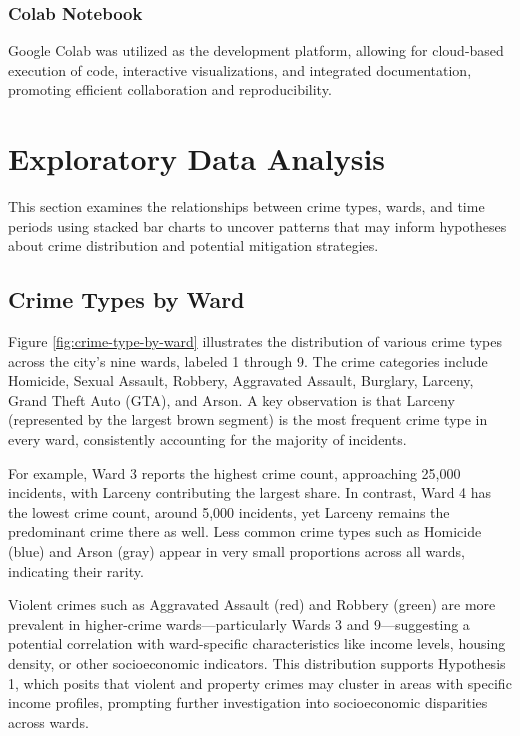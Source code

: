\documentclass{report}
\begin{document}
	\subsection{Colab Notebook}
	Google Colab was utilized as the development platform, allowing for cloud-based execution of code, interactive visualizations, and integrated documentation, promoting efficient collaboration and reproducibility.
	
	\chapter{Exploratory Data Analysis}
	
	\par This section examines the relationships between crime types, wards, and time periods using stacked bar charts to uncover patterns that may inform hypotheses about crime distribution and potential mitigation strategies.
	
	\section{Crime Types by Ward}
	\par Figure \ref{fig:crime-type-by-ward} illustrates the distribution of various crime types across the city’s nine wards, labeled 1 through 9. The crime categories include Homicide, Sexual Assault, Robbery, Aggravated Assault, Burglary, Larceny, Grand Theft Auto (GTA), and Arson. A key observation is that Larceny (represented by the largest brown segment) is the most frequent crime type in every ward, consistently accounting for the majority of incidents.
	
	For example, Ward 3 reports the highest crime count, approaching 25,000 incidents, with Larceny contributing the largest share. In contrast, Ward 4 has the lowest crime count, around 5,000 incidents, yet Larceny remains the predominant crime there as well. Less common crime types such as Homicide (blue) and Arson (gray) appear in very small proportions across all wards, indicating their rarity.
	
	Violent crimes such as Aggravated Assault (red) and Robbery (green) are more prevalent in higher-crime wards—particularly Wards 3 and 9—suggesting a potential correlation with ward-specific characteristics like income levels, housing density, or other socioeconomic indicators. This distribution supports Hypothesis 1, which posits that violent and property crimes may cluster in areas with specific income profiles, prompting further investigation into socioeconomic disparities across wards.
	
\end{document}
